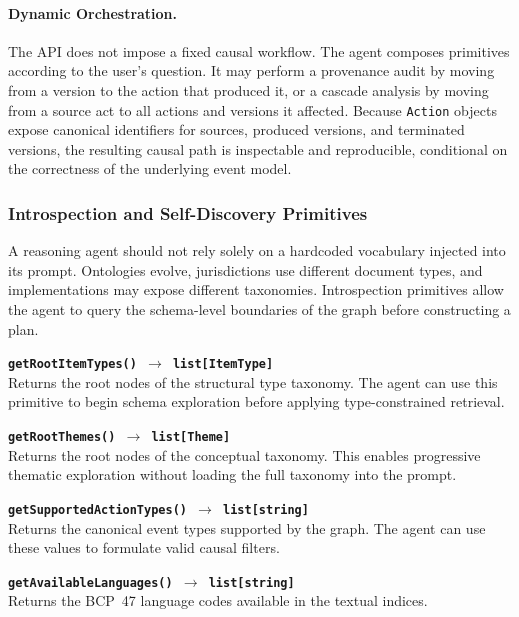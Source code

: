 \documentclass[11pt]{article}
\begin{document}
\paragraph{Dynamic Orchestration.}
The API does not impose a fixed causal workflow. The agent composes primitives according to the user's question. It may perform a provenance audit by moving from a version to the action that produced it, or a cascade analysis by moving from a source act to all actions and versions it affected. Because \texttt{Action} objects expose canonical identifiers for sources, produced versions, and terminated versions, the resulting causal path is inspectable and reproducible, conditional on the correctness of the underlying event model.

\subsubsection{Introspection and Self-Discovery Primitives}
\label{subsubsec:introspection_primitives}

A reasoning agent should not rely solely on a hardcoded vocabulary injected into its prompt. Ontologies evolve, jurisdictions use different document types, and implementations may expose different taxonomies. Introspection primitives allow the agent to query the schema-level boundaries of the graph before constructing a plan.

\vspace{0.3cm}
\noindent\textbf{\texttt{getRootItemTypes() $\rightarrow$ list[ItemType]}}\\
Returns the root nodes of the structural type taxonomy. The agent can use this primitive to begin schema exploration before applying type-constrained retrieval.

\vspace{0.3cm}
\noindent\textbf{\texttt{getRootThemes() $\rightarrow$ list[Theme]}}\\
Returns the root nodes of the conceptual taxonomy. This enables progressive thematic exploration without loading the full taxonomy into the prompt.

\vspace{0.3cm}
\noindent\textbf{\texttt{getSupportedActionTypes() $\rightarrow$ list[string]}}\\
Returns the canonical event types supported by the graph. The agent can use these values to formulate valid causal filters.

\vspace{0.3cm}
\noindent\textbf{\texttt{getAvailableLanguages() $\rightarrow$ list[string]}}\\
Returns the BCP~47 language codes available in the textual indices.
\end{document}
